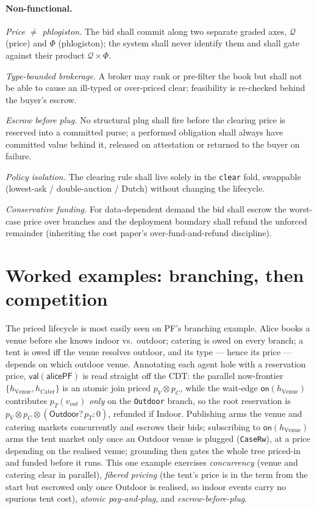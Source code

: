 \documentclass[11pt]{article}
\theoremstyle{definition}
\newcommand{\PF}{\textsf{PF}}
\newcommand{\CDT}{\textsf{CDT}}
\newcommand{\val}{\ensuremath{\mathsf{val}}}
\newcommand{\Qval}{\mathcal{Q}}            %
\newcommand{\Phl}{\Phi}                     %
\begin{document}
\paragraph{Non-functional.}
\begin{description}[leftmargin=4.0em,style=nextline,font=\normalfont\bfseries]
\item[NFR-9] \emph{Price $\neq$ phlogiston.} The bid shall commit along two separate graded axes,
$\Qval$ (price) and $\Phl$ (phlogiston); the system shall never identify them and shall gate against
their product $\Qval\times\Phl$.
\item[NFR-10] \emph{Type-bounded brokerage.} A broker may rank or pre-filter the book but shall not be
able to cause an ill-typed or over-priced clear; feasibility is re-checked behind the buyer's escrow.
\item[NFR-11] \emph{Escrow before plug.} No structural plug shall fire before the clearing price is
reserved into a committed purse; a performed obligation shall always have committed value behind it,
released on attestation or returned to the buyer on failure.
\item[NFR-12] \emph{Policy isolation.} The clearing rule shall live solely in the \texttt{clear} fold,
swappable (lowest-ask / double-auction / Dutch) without changing the lifecycle.
\item[NFR-13] \emph{Conservative funding.} For data-dependent demand the bid shall escrow the
worst-case price over branches and the deployment boundary shall refund the unforced remainder
(inheriting the cost paper's over-fund-and-refund discipline).
\end{description}

\section{Worked examples: branching, then competition}\label{sec:example}
The priced lifecycle is most easily seen on \PF{}'s branching example. Alice books a venue before she
knows indoor vs.\ outdoor; catering is owed on every branch; a tent is owed iff the venue resolves
outdoor, and its type --- hence its price --- depends on which outdoor venue. Annotating each agent
hole with a reservation price, $\val(\textsf{alicePF})$ is read straight off the \CDT{}: the parallel
now-frontier $\{h_{\mathrm{Venue}},h_{\mathrm{Cater}}\}$ is an atomic join priced $p_V\otimes p_C$,
while the wait-edge $\textsf{on}(h_{\mathrm{Venue}})$ contributes $p_T(v_{out})$ \emph{only} on the
\texttt{Outdoor} branch, so the root reservation is $p_V\otimes p_C\otimes(\textsf{Outdoor}?\,p_T:0)$,
refunded if Indoor. Publishing arms the venue and catering markets concurrently and escrows their
bids; subscribing to $\textsf{on}(h_{\mathrm{Venue}})$ arms the tent market only once an Outdoor venue
is plugged (\texttt{CaseRw}), at a price depending on the realised venue; grounding then gates the
whole tree priced-in and funded before it runs. This one example exercises \emph{concurrency} (venue
and catering clear in parallel), \emph{fibered pricing} (the tent's price is in the term from the
start but escrowed only once Outdoor is realised, so indoor events carry no spurious tent cost),
\emph{atomic pay-and-plug}, and \emph{escrow-before-plug}.
\end{document}
